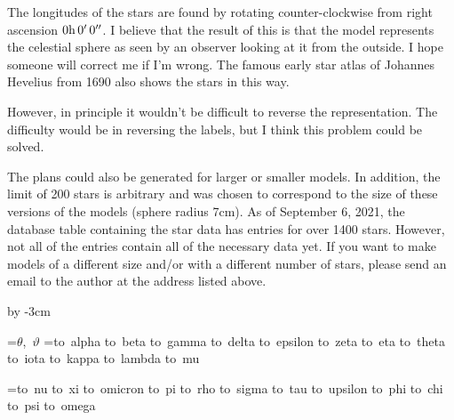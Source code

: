 The longitudes of the stars are found by rotating counter-clockwise
from right ascension $0\rm{h}\thinspace 0^\prime\thinspace 0^{\prime\prime}$.
I believe that the result of this is that the model represents the celestial sphere
as seen by an observer looking at it from the outside. I hope someone will correct me
if I'm wrong. The famous early star atlas of Johannes Hevelius from 1690 also shows the stars
in this way.

However, in principle it wouldn't be difficult to reverse the representation. The difficulty would be
in reversing the labels, but I think this problem could be solved.

The plans could also be generated for larger or smaller models.
In addition, the limit of 200 stars is arbitrary and was chosen to correspond to the size of
these versions of the models (sphere radius 7cm).  
As of September 6, 2021, the database table containing the star data has
entries for over 1400 stars.  However, not all of the entries contain all of the necessary data yet.
If you want to make models of a different size and/or with a different number of stars, please send
an email to the author at the address listed above.
\baselineskip
\endgroup

\advance\hsize by -3cm

\begingroup
\medium
\obeylines
{}=\hbox{$\displaystyle \theta$, $\vartheta$\quad}
=\vbox{\hbox{\hbox to  alpha}
\hbox{\hbox to  beta}
\hbox{\hbox to  gamma}
\hbox{\hbox to  delta}
\hbox{\hbox to  epsilon}
\hbox{\hbox to  zeta}
\hbox{\hbox to  eta}
\hbox{\hbox to  theta}
\hbox{\hbox to  iota}
\hbox{\hbox to  kappa}
\hbox{\hbox to  lambda}
\hbox{\hbox to  mu}}

=\vbox{\hbox{\hbox to  nu}
\hbox{\hbox to  xi}
\hbox{\hbox to  omicron}
\hbox{\hbox to  pi}
\hbox{\hbox to  rho}
\hbox{\hbox to  sigma}
\hbox{\hbox to  tau}
\hbox{\hbox to  upsilon}
\hbox{\hbox to  phi}
\hbox{\hbox to  chi}
\hbox{\hbox to  psi}
\hbox{\hbox to  omega}}

